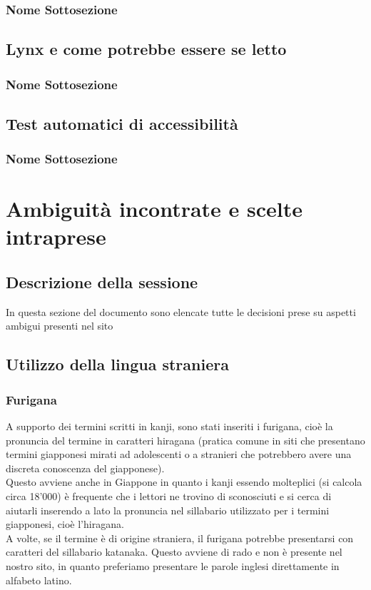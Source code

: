 \documentclass[openany, a4paper, 12pt]{report}
\begin{document}
			\subsection{Nome Sottosezione}
		\section{Lynx e come potrebbe essere se letto}
			\subsection{Nome Sottosezione}
		\section{Test automatici di accessibilità}
			\subsection{Nome Sottosezione}

	\chapter{Ambiguità incontrate e scelte intraprese}
		\section{Descrizione della sessione}
			In questa sezione del documento sono elencate tutte le decisioni prese su aspetti ambigui presenti nel sito\\
		\section{Utilizzo della lingua straniera}
			\subsection{Furigana}
				A supporto dei termini scritti in kanji, sono stati inseriti i furigana, cioè la pronuncia del termine in caratteri hiragana (pratica comune in siti che presentano termini giapponesi mirati ad adolescenti o a stranieri che potrebbero avere una discreta conoscenza del giapponese).\\
				Questo avviene anche in Giappone in quanto i kanji essendo molteplici (si calcola circa 18'000) è frequente che i lettori ne trovino di sconosciuti e si cerca di aiutarli inserendo a lato la pronuncia nel sillabario utilizzato per i termini giapponesi, cioè l'hiragana.\\
				A volte, se il termine è di origine straniera, il furigana potrebbe presentarsi con caratteri del sillabario katanaka. Questo avviene di rado e non è presente nel nostro sito, in quanto preferiamo presentare le parole inglesi direttamente in alfabeto latino.
\end{document}

